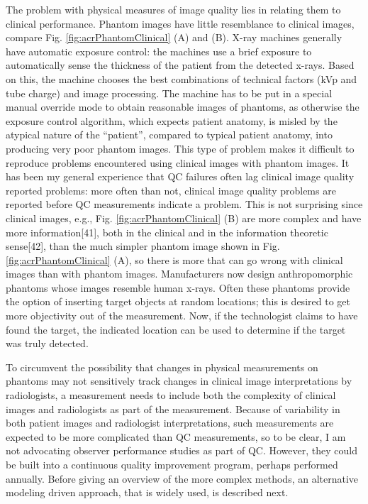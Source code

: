 \documentclass[
]{book}
\begin{document}
The problem with physical measures of image quality lies in relating them to clinical performance. Phantom images have little resemblance to clinical images, compare Fig. \ref{fig:acrPhantomClinical} (A) and (B). X-ray machines generally have automatic exposure control: the machines use a brief exposure to automatically sense the thickness of the patient from the detected x-rays. Based on this, the machine chooses the best combinations of technical factors (kVp and tube charge) and image processing. The machine has to be put in a special manual override mode to obtain reasonable images of phantoms, as otherwise the exposure control algorithm, which expects patient anatomy, is misled by the atypical nature of the ``patient'', compared to typical patient anatomy, into producing very poor phantom images. This type of problem makes it difficult to reproduce problems encountered using clinical images with phantom images. It has been my general experience that QC failures often lag clinical image quality reported problems: more often than not, clinical image quality problems are reported before QC measurements indicate a problem. This is not surprising since clinical images, e.g., Fig. \ref{fig:acrPhantomClinical} (B) are more complex and have more information{[}41{]}, both in the clinical and in the information theoretic sense{[}42{]}, than the much simpler phantom image shown in Fig. \ref{fig:acrPhantomClinical} (A), so there is more that can go wrong with clinical images than with phantom images. Manufacturers now design anthropomorphic phantoms whose images resemble human x-rays. Often these phantoms provide the option of inserting target objects at random locations; this is desired to get more objectivity out of the measurement. Now, if the technologist claims to have found the target, the indicated location can be used to determine if the target was truly detected.

To circumvent the possibility that changes in physical measurements on phantoms may not sensitively track changes in clinical image interpretations by radiologists, a measurement needs to include both the complexity of clinical images and radiologists as part of the measurement. Because of variability in both patient images and radiologist interpretations, such measurements are expected to be more complicated than QC measurements, so to be clear, I am not advocating observer performance studies as part of QC. However, they could be built into a continuous quality improvement program, perhaps performed annually. Before giving an overview of the more complex methods, an alternative modeling driven approach, that is widely used, is described next.
\end{document}
